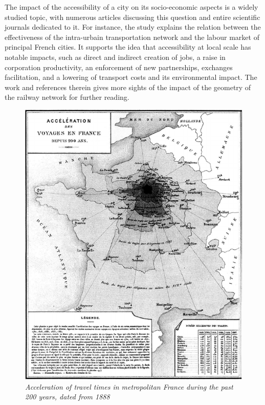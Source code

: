 \documentclass{vgtc}                          %
\begin{document}


The impact of the accessibility of a city on its socio-economic aspects is a widely studied topic, with numerous articles discussing this question and entire scientific journals dedicated to it. For instance, the study \cite{lee1997impact} explains the relation between the effectiveness of the intra-urbain transportation network and the labour market of principal French cities. It supports the idea that accessibility at local scale has notable impacts, such as direct and indirect creation of jobs, a raise in corporation productivity, an enforcement of new partnerships, exchanges facilitation, and a lowering of transport costs and its environmental impact. The work \cite{cao2017investigating} and references therein gives more sights of the impact of the geometry of the railway network for further reading. 





\begin{figure}[h]
 \centering %
 \includegraphics[scale=1, width=\columnwidth]{Vieille_Carte.png}
 \caption{\textit{Acceleration of travel times in metropolitan France during the past 200 years, dated from 1888} \cite{Cheysson} }
 \label{fig:sample}
\end{figure}
\end{document}
